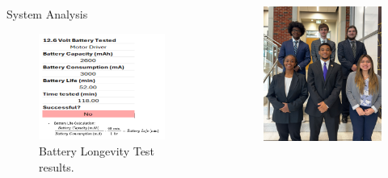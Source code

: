 \documentclass[final]{beamer}
\newlength{\sepwidth}
\newlength{\colwidth}
\newcommand{\separatorcolumn}{\begin{column}{\sepwidth}\end{column}}
\begin{document}
\begin{frame}[t]
\begin{columns}[t]
\begin{column}{\colwidth}
\begin{block}{System Analysis}
    \begin{figure}
    \centering
    \includegraphics[width=20.0cm]{Images/battery_test_results.png}
    \caption{Battery Longevity Test results.}
    \end{figure}

  \end{block}

\end{column}

\separatorcolumn

\begin{column}{\colwidth}
  \begin{figure}
    \centering
    \includegraphics[width=19.0cm]{Images/Capstone_photo.png}
  \end{figure}
 

\end{column}
\end{columns}
\end{frame}
\end{document}
